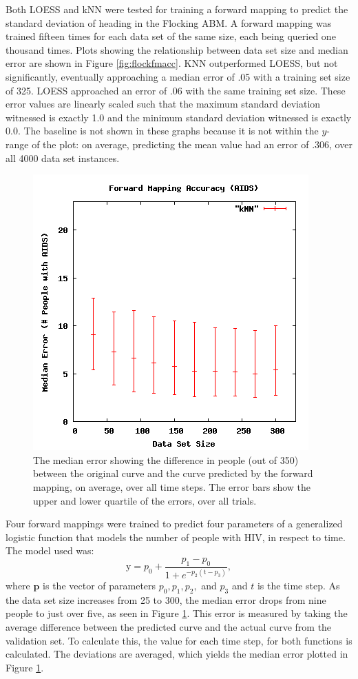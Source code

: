 Both LOESS and kNN were tested for training a forward mapping to predict the standard deviation of heading in the Flocking ABM.
A forward mapping was trained fifteen times for each data set of the same size, each being queried one thousand times.
Plots showing the relationship between data set size and median error are shown in Figure \ref{fig:flockfmacc}. 
KNN outperformed LOESS, but not significantly, eventually approaching a median error of .05 with a training set size of 325.
LOESS approached an error of .06 with the same training set size.
These error values are linearly scaled such that the maximum standard deviation witnessed is exactly 1.0 and the minimum standard deviation witnessed is exactly 0.0.
The baseline is not shown in these graphs because it is not within the $y$-range of the plot: on average, predicting the mean value had an error of .306, over all 4000 data set instances.


\begin{figure}[ht]
\centering
\includegraphics[scale=.5]{images/results_aids/aids-fmacc.png}
\caption{The median error showing the difference in people  (out of 350) between the original curve and the curve predicted by the forward mapping, on average, over all time steps.
The error bars show the upper and lower quartile of the errors, over all trials.}
\label{fig:aidsfmacc}
\end{figure}

Four forward mappings were trained to predict four parameters of a generalized logistic function that models the number of people with HIV, in respect to time.
The model used was:
\[ \mathrm{y} = p_0 + \displaystyle \frac{p_1 - p_0}{1 + e ^ {-p_2  (\mathrm{t} - p_3) } }, \]
where $\mathbf p$ is the vector of parameters $p_0, p_1, p_2,$ and $p_3$ and $t$ is the time step.
As the data set size increases from 25 to 300, the median error drops from nine people to just over five, as seen in Figure \ref{fig:aidsfmacc}.
This error is measured by taking the average difference between the predicted curve and the actual curve from the validation set.
To calculate this, the value for each time step, for both functions is calculated.
The deviations are averaged, which yields the median error plotted in Figure \ref{fig:aidsfmacc}.


